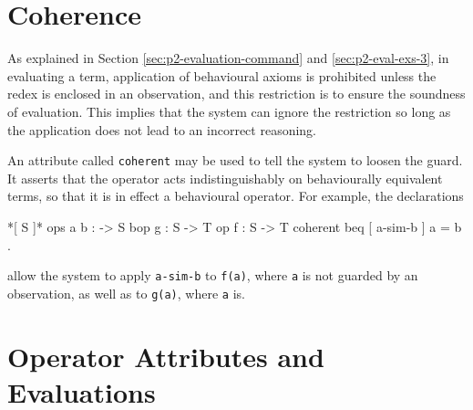 \documentclass[a4paper]{memoir}
\begin{document}
\section{Coherence} \label{sec:p2-coherence}

As explained in Section \ref{sec:p2-evaluation-command} and
\ref{sec:p2-eval-exs-3},
in evaluating a term, application of behavioural axioms is prohibited
unless the redex is enclosed in an observation, and
this restriction is to ensure the soundness of evaluation.
This implies that the system can ignore the restriction
so long as the application does not lead to an incorrect reasoning.

An attribute called \verb|coherent| may be used to tell the system
to loosen the guard. It asserts that the operator acts
indistinguishably on behaviourally equivalent terms, so that
it is in effect a behavioural operator.
For example, the declarations
\begin{vvtm}
\begin{ccode}
  [ T ]
  *[ S ]*
  ops a b : -> S
  bop g : S -> T
  op f : S -> T { coherent }
  beq [ a-sim-b ] a = b .
\end{ccode}
\end{vvtm}
allow the system to apply \verb|a-sim-b| to \verb|f(a)|, where \verb|a|
is not guarded by an observation, as well as to \verb|g(a)|, where
\verb|a| is.

\section{Operator Attributes and Evaluations}\label{sec:p2-op-attr-eval}
\end{document}
